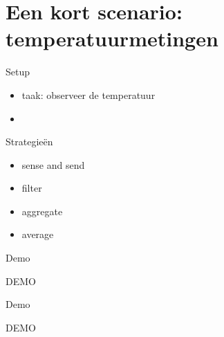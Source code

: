 \documentclass[presentation, bigger]{beamer}
\begin{document}
\section{Een kort scenario: temperatuurmetingen}

\begin{frame}{Setup}
  \begin{itemize}
  \item taak: observeer de temperatuur
  \item 
  \end{itemize}
\end{frame}

\begin{frame}{Strategie\"en}
  \begin{itemize}
  \item sense and send
  \item filter
  \item aggregate
  \item average
  \end{itemize}
\end{frame}

\begin{frame}{Demo}
  \begin{center}
    \Huge{DEMO}
  \end{center}

\end{frame}

\begin{frame}{Demo}
  \begin{center}
    \Huge{DEMO}
  \end{center}

\end{frame}
\end{document}
